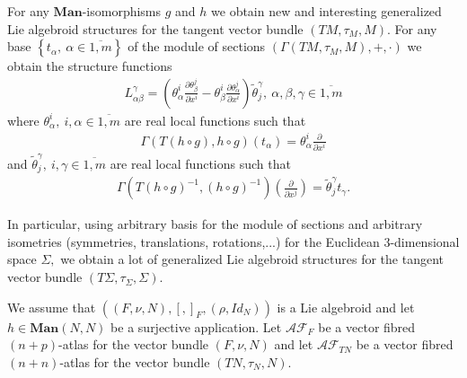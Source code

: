 \documentclass[11pt]{article}
\begin{document}
For any $\mathbf{Man}$-isomorphisms $g$ and $h$ we obtain new and
interesting generalized Lie algebroid structures for the tangent vector
bundle $\left( TM,\tau _{M},M\right) .$ For any base $\left\{ t_{\alpha
},~\alpha \in \overline{1,m}\right\} $ of the module of sections $\left(
\Gamma \left( TM,\tau _{M},M\right) ,+,\cdot \right) $ we obtain the
structure functions%
\begin{equation*}
\begin{array}{c}
L_{\alpha \beta }^{\gamma }=\left( \theta _{\alpha }^{i}\frac{\partial
\theta _{\beta }^{j}}{\partial x^{i}}-\theta _{\beta }^{i}\frac{\partial
\theta _{\alpha }^{j}}{\partial x^{i}}\right) \tilde{\theta}_{j}^{\gamma
},~\alpha ,\beta ,\gamma \in \overline{1,m}%
\end{array}%
\end{equation*}%
where $\theta _{\alpha }^{i},~i,\alpha \in \overline{1,m}$ are real local
functions such that
\begin{equation*}
\begin{array}{c}
\Gamma \left( T\left( h\circ g\right) ,h\circ g\right) \left( t_{\alpha
}\right) =\theta _{\alpha }^{i}\frac{\partial }{\partial x^{i}}%
\end{array}%
\end{equation*}%
and $\tilde{\theta}_{j}^{\gamma },~i,\gamma \in \overline{1,m}$ are real
local functions such that
\begin{equation*}
\begin{array}{c}
\Gamma \left( T\left( h\circ g\right) ^{-1},\left( h\circ g\right)
^{-1}\right) \left( \frac{\partial }{\partial x^{j}}\right) =\tilde{\theta}%
_{j}^{\gamma }t_{\gamma }.%
\end{array}%
\end{equation*}

In particular, using arbitrary basis for the module of sections and
arbitrary isometries (symmetries, translations, rotations,...) for the
Euclidean $3$-dimensional space $\Sigma ,$ we obtain a lot of generalized
Lie algebroid structures for the tangent vector bundle $\left( T\Sigma ,\tau
_{\Sigma },\Sigma \right) $.

We assume that $\left( \left( F,\nu ,N\right) ,\left[ ,\right] _{F},\left(
\rho ,Id_{N}\right) \right) $ is a Lie algebroid and let $h\in \mathbf{Man}%
\left( N,N\right) $ be a surjective application. Let $\mathcal{AF}_{F}$ be a
vector fibred $\left( n+p\right) $-atlas for the vector bundle $\left( F,\nu
,N\right) $ and let $\mathcal{AF}_{TN}$ be a vector fibred $\left(
n+n\right) $-atlas for the vector bundle $\left( TN,\tau _{N},N\right) $.
\end{document}
